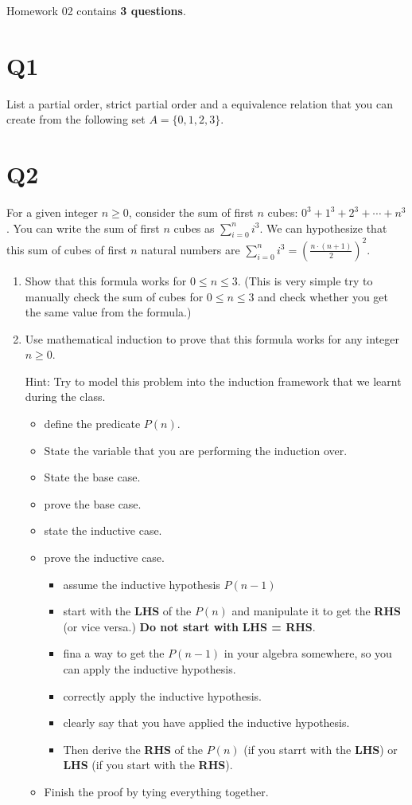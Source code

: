 \documentclass[12pt]{exam}
\begin{document}
Homework 02 contains \textbf{3 questions}.

\section{Q1}
List a partial order, strict partial order and a equivalence relation that you can create from the following set $A=\{0,1,2,3\}$.

\section{Q2} 
For a given integer $n \geq 0$, consider the sum of first $n$ cubes: $0^3 + 1^3 + 2^3 + \cdots + n^3$. You can write the sum of first $n$ cubes as $\sum_{i=0}^{n}i^3$. We can hypothesize that this sum of cubes of first $n$ natural numbers are $\sum_{i=0}^{n}i^3 = (\frac{n\cdot(n+1)}{2})^2$. 

\begin{enumerate}
    \item Show that this formula works for $0 \leq n \leq 3$. (This is very simple try to manually check the sum of cubes for $0 \leq n \leq 3$ and check whether you get the same value from the formula.)
    \item Use mathematical induction to prove that this formula works for any integer $n \geq 0$.
    
    Hint: Try to model this problem into the induction framework that we learnt during the class. 
    \begin{itemize}
        \item define the predicate $P(n)$.
        \item State the variable that you are performing the induction over.
        \item State the base case.
        \item prove the base case.
        \item state the inductive case.
        \item prove the inductive case.
            \begin{itemize}
                \item assume the inductive hypothesis $P(n-1)$
                \item start with the \textbf{LHS} of the $P(n)$ and manipulate it to get the \textbf{RHS} (or vice versa.) \textbf{Do not start with }\textbf{LHS = RHS}.
                \item fina a way to get the $P(n-1)$ in your algebra somewhere, so you can apply the inductive hypothesis.
                \item correctly apply the inductive hypothesis.
                \item clearly say that you have applied the inductive hypothesis.
                \item Then derive the \textbf{RHS} of the $P(n)$ (if you starrt with the \textbf{LHS}) or \textbf{LHS} (if you start with the \textbf{RHS}).
            \end{itemize}
        \item Finish the proof by tying everything together.
    \end{itemize}
\end{enumerate}
\end{document}
